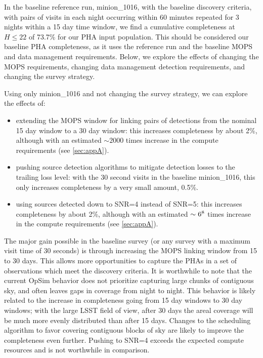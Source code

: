 In the baseline reference run, minion\_1016, with the baseline discovery criteria, with pairs of visits in each night occurring within 60 minutes repeated for 3 nights within a 15 day time window, we find a cumulative completeness at $H\le22$ of 73.7\% for our PHA input population. This should be considered our baseline PHA completeness, as it uses the reference run and the baseline MOPS and data management requirements. Below, we explore the effects of changing the MOPS requirements, changing data management detection requirements, and changing the survey strategy. 

Using only minion\_1016 and not changing the survey strategy, we can explore the effects of:
\begin{itemize}
\item extending the MOPS window for linking pairs of detections from the nominal 15 day window to a 30 day window: this increases completeness by about 2\%, although with an estimated $\sim2000$ times increase in the compute requirements (see \ref{sec:appA}).
\item pushing source detection algorithms to mitigate detection losses to the trailing loss level: with the 30 second visits in the baseline minion\_1016, this only increases completeness by a very small amount, 0.5\%.
\item using sources detected down to SNR=4 instead of SNR=5: this increases completeness by about 2\%, although with an estimated $\sim6\time10^8$ times increase in the compute requirements (see \ref{sec:appA}). 
\end{itemize}

The major gain possible in the baseline survey (or any survey with a maximum visit time of 30 seconds) is through increasing the MOPS linking window from 15 to 30 days. This allows more opportunities to capture the PHAs in a set of observations which meet the discovery criteria. It is worthwhile to note that the current OpSim behavior does not prioritize capturing large chunks of contiguous sky, and often leaves gaps in coverage from night to night. This behavior is likely related to the increase in completeness going from 15 day windows to 30 day windows; with the large LSST field of view, after 30 days the areal coverage will be much more evenly distributed than after 15 days. Changes to the scheduling algorithm to favor covering contiguous blocks of sky are likely to improve the completeness even further.  Pushing to SNR=4 exceeds the expected compute resources and is not worthwhile in comparison.

